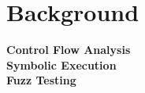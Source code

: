 \section{Background}
\label{sec:background}

\noindent\textbf{Control Flow Analysis}
\\
\noindent\textbf{Symbolic Execution}
\\
\noindent\textbf{Fuzz Testing}



